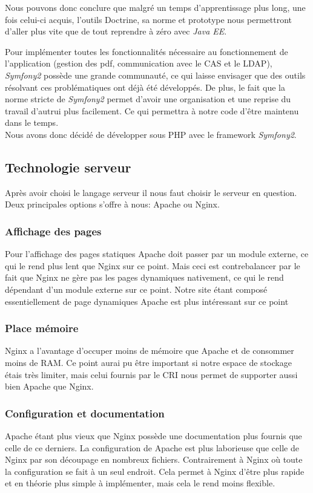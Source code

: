 Nous pouvons donc conclure que malgré un temps d'apprentissage plus long, une fois celui-ci acquis, l'outils Doctrine, sa norme et prototype nous permettront d'aller plus vite que de tout reprendre à zéro avec \textit{Java EE}.

Pour implémenter toutes les fonctionnalités nécessaire au fonctionnement de l'application (gestion des pdf, communication avec le CAS et le LDAP), \textit{Symfony2} possède une grande communauté, ce qui laisse envisager que des outils résolvant ces problématiques ont déjà été développés.
De plus, le fait que la norme stricte de \textit{Symfony2} permet d'avoir une organisation et une reprise du travail d'autrui plus facilement. Ce qui permettra à notre code d'être maintenu dans le temps.\\

Nous avons donc décidé de développer sous PHP avec le framework \textit{Symfony2}.

\subsection{Technologie serveur}

Après avoir choisi le langage serveur il nous faut choisir le serveur en question. Deux principales options s'offre à nous: Apache ou Nginx.

\subsubsection{Affichage des pages}
Pour l'affichage des pages statiques Apache doit passer par un module externe, ce qui le rend plus lent que Nginx sur ce point.
Mais ceci est contrebalancer par le fait que Nginx ne gère pas les pages dynamiques nativement, ce qui le rend dépendant d'un module externe sur ce point.
Notre site étant composé essentiellement de page dynamiques Apache est plus intéressant sur ce point

\subsubsection{Place mémoire}
Nginx a l'avantage d'occuper moins de mémoire que Apache et de consommer moins de RAM.
Ce point aurai pu être important si notre espace de stockage étais très limiter, mais celui fournis par le CRI nous permet de supporter aussi bien Apache que Nginx.

\subsubsection{Configuration et documentation}
Apache étant plus vieux que Nginx possède une documentation plus fournis que celle de ce derniers.
La configuration de Apache est plus laborieuse que celle de Nginx par son découpage en nombreux fichiers. Contrairement à Nginx où toute la configuration se fait à un seul endroit.
Cela permet à Nginx d'être plus rapide et en théorie plus simple à implémenter, mais cela le rend moins flexible.

